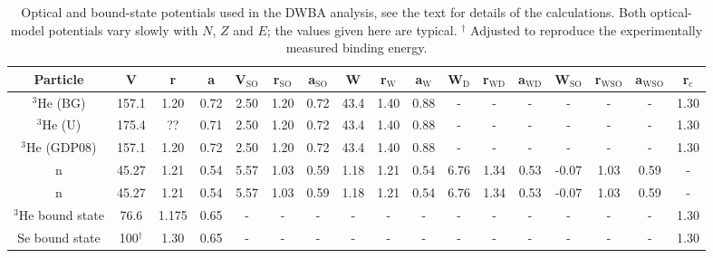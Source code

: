 \begin{table}\footnotesize
\caption{\label{tab:typicalPotentials} Optical and bound-state potentials used in the DWBA analysis, see the text for details of the calculations. Both optical-model potentials vary slowly with $N$, $Z$ and $E$; the values given here are typical. $^{\dagger}$ Adjusted to reproduce the experimentally measured binding energy.}
\begin{tabular}{ccccccccccccccccc}
\hline
Particle & V & r & a & V$_{\text{SO}}$ & r$_{\text{SO}}$ & a$_{\text{SO}}$ & W & r$_{\text{W}}$ & a$_{\text{W}}$ & W$_{\text{D}}$ & r$_{\text{WD}}$ & a$_{\text{WD}}$ & W$_{\text{SO}}$ & r$_{\text{WSO}}$ & a$_{\text{WSO}}$ & r$_{\text{c}}$ \\
\hline
$^{3}$He (BG) & 157.1 & 1.20 & 0.72 & 2.50 & 1.20 & 0.72 & 43.4 & 1.40 & 0.88 & - & - & - & - & - & - & 1.30\\
$^{3}$He (U) & 175.4 & ?? & 0.71 & 2.50 & 1.20 & 0.72 & 43.4 & 1.40 & 0.88 & - & - & - & - & - & - & 1.30\\
$^{3}$He (GDP08) & 157.1 & 1.20 & 0.72 & 2.50 & 1.20 & 0.72 & 43.4 & 1.40 & 0.88 & - & - & - & - & - & - & 1.30\\

n & 45.27 & 1.21 & 0.54 & 5.57 & 1.03 & 0.59 & 1.18 & 1.21 & 0.54 & 6.76 & 1.34 & 0.53 & -0.07 & 1.03 & 0.59 & -\\
n & 45.27 & 1.21 & 0.54 & 5.57 & 1.03 & 0.59 & 1.18 & 1.21 & 0.54 & 6.76 & 1.34 & 0.53 & -0.07 & 1.03 & 0.59 & -\\

$^3$He bound state & 76.6 & 1.175 & 0.65 & - & - & - & - & - & - & - & - & - & - & - & - & 1.30\\

Se bound state & 100$^{\dagger}$ & 1.30 & 0.65 & - & - & - & - & - & - & - & - & - & - & - & - & 1.30\\
\hline
\end{tabular}
\end{table}
